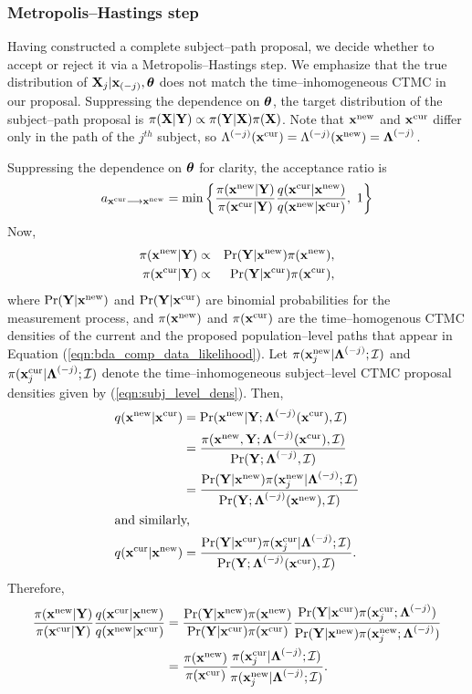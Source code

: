 \subsubsection{Metropolis--Hastings step}
Having constructed a complete subject--path proposal, we decide whether to accept or reject it via a Metropolis--Hastings step. We emphasize that the true distribution of $ \bX_j | \bx_{(-j)},\btheta $ does not match the time--inhomogeneous CTMC in our proposal. Suppressing the dependence on $ \btheta $, the target distribution of the subject--path proposal is $ \pi(\bX | \bY) \propto\pi(\bY | \bX)\pi(\bX) $. Note that $ \xnew $ and $ \xcur $ differ only in the path of the $ j^{th} $ subject, so $ \Lambda^{(-j)}(\xcur) = \Lambda^{(-j)}(\xnew)=\bLambda^{(-j)} $.

Suppressing the dependence on $ \btheta$ for clarity, the acceptance ratio is
\begin{equation*}
a_{\xcur \longrightarrow \xnew} = \min \left \lbrace \frac{\pi(\xnew|\by)}{\pi(\xcur|\by)}\frac{q(\xcur|\xnew)}{q(\xnew|\xcur)},\ 1\right \rbrace
\end{equation*}
Now, 
\begin{eqnarray*}
	\pi(\xnew|\by) &\propto& \Pr(\by|\xnew)\pi(\xnew),\\
	\pi(\xcur|\by) &\propto& \Pr(\by|\xcur)\pi(\xcur),
\end{eqnarray*}
where $ \Pr(\by|\xnew) $ and $ \Pr(\by|\xcur )$ are binomial probabilities for the measurement process, and $ \pi(\xnew) $ and $ \pi(\xcur) $ are the time--homogenous CTMC densities of the current and the proposed population--level paths that appear in Equation (\ref{eqn:bda_comp_data_likelihood}). Let $ \pi(\xnew_j|\bLambda^{(-j)}; \mcI) $ and $ \pi(\xcur_j| \bLambda^{(-j)}; \mcI) $ denote the time--inhomogeneous subject--level CTMC proposal densities given by (\ref{eqn:subj_level_dens}). Then,
\begin{align*}
	q(\xnew|\xcur) &= \Pr(\xnew|\by; \bLambda^{(-j)}(\xcur), \mcI)\\
	&= \frac{\pi(\xnew, \by; \bLambda^{(-j)}(\xcur), \mcI)}{\Pr(\by; \bLambda^{(-j)}, \mcI)}\\
	&= \frac{\Pr(\by|\xnew)\pi(\xnew_j| \bLambda^{(-j)}; \mcI)}{\Pr(\by; \bLambda^{(-j)}(\xnew), \mcI)}\\
	\shortintertext{and similarly, } q(\xcur|\xnew) &= \frac{\Pr(\by|\xcur)\pi(\xcur_j| \bLambda^{(-j)}; \mcI)}{\Pr(\by; \bLambda^{(-j)}(\xcur), \mcI)}.
\end{align*}
Therefore, 
\begin{align*}
	\frac{\pi(\xnew|\by)}{\pi(\xcur|\by)}\frac{q(\xcur|\xnew)}{q(\xnew|\xcur)} &= \frac{\Pr(\by|\xnew)\pi(\xnew)}{\Pr(\by|\xcur)\pi(\xcur)}\frac{\Pr(\by|\xcur)\pi(\xcur_j; \bLambda^{(-j)})}{\Pr(\by|\xnew)\pi(\xnew_j; \bLambda^{(-j)})}\\
	&= \frac{\pi(\xnew)}{\pi(\xcur)}\frac{\pi(\xcur_j| \bLambda^{(-j)}; \mcI)}{\pi(\xnew_j| \bLambda^{(-j)}; \mcI)}.
\end{align*}
